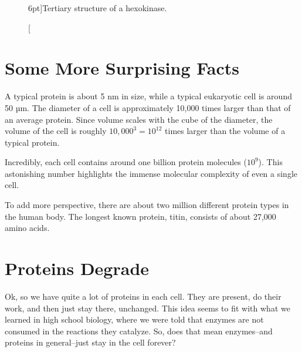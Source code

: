 \begin{figure}
    \caption[][6pt]{Tertiary structure of a hexokinase.}
    \label{fig:hexokinase}
\end{figure}

\section{Some More Surprising Facts}

A typical protein is about 5 nm in size, while a typical eukaryotic cell is around 50 µm. The diameter of a cell is approximately 10,000 times larger than that of an average protein. Since volume scales with the cube of the diameter, the volume of the cell is roughly $10,000^3 = 10^{12}$ times larger than the volume of a typical protein.

Incredibly, each cell contains around one billion protein molecules ($10^9$). This astonishing number highlights the immense molecular complexity of even a single cell.

To add more perspective, there are about two million different protein types in the human body. The longest known protein, titin, consists of about 27,000 amino acids.

\section{Proteins Degrade}

Ok, so we have quite a lot of proteins in each cell. They are present, do their work, and then just stay there, unchanged. This idea seems to fit with what we learned in high school biology, where we were told that enzymes are not consumed in the reactions they catalyze. So, does that mean enzymes--and proteins in general--just stay in the cell forever?

